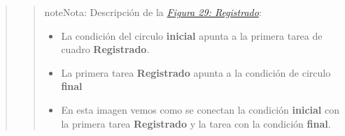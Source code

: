 \documentclass[letterpaper,11pt,spanish]{sphinxmanual}
\begin{document}
\begin{quote}
\begin{quote}
\begin{notice}{note}{Nota:}
Descripción de la {\hyperref[_templates/Contenido6/Parte4:figura29]{\emph{Figura 29: Registrado}}}:
\begin{itemize}
\item {} 
La condición del circulo \textbf{inicial} apunta a la primera tarea de cuadro \textbf{Registrado}.

\item {} 
La primera tarea \textbf{Registrado} apunta a la condición de circulo \textbf{final}

\item {} 
En esta imagen vemos como se conectan la condición  \textbf{inicial} con la primera tarea \textbf{Registrado}  y la tarea con la condición \textbf{final}.

\end{itemize}
\end{notice}
\end{quote}
\end{quote}
\end{document}
